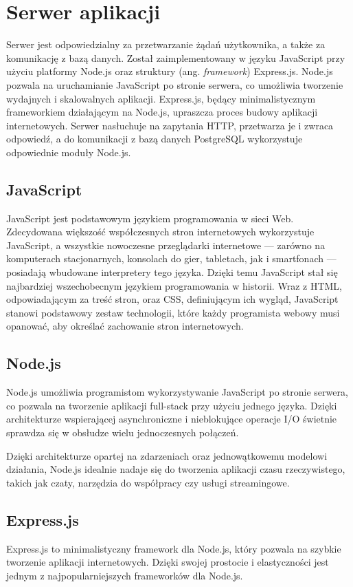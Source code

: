 \section{Serwer aplikacji}
Serwer jest odpowiedzialny za przetwarzanie żądań użytkownika, a także za komunikację z bazą danych. Został zaimplementowany w języku JavaScript przy użyciu platformy Node.js oraz struktury (ang. \textit{framework}) Express.js. Node.js pozwala na uruchamianie JavaScript po stronie serwera, co umożliwia tworzenie wydajnych i skalowalnych aplikacji. Express.js, będący minimalistycznym frameworkiem działającym na Node.js, upraszcza proces budowy aplikacji internetowych. Serwer nasłuchuje na zapytania HTTP, przetwarza je i zwraca odpowiedź, a do komunikacji z bazą danych PostgreSQL wykorzystuje odpowiednie moduły Node.js.


\subsection{JavaScript}
JavaScript jest podstawowym językiem programowania w sieci Web. Zdecydowana większość współczesnych stron internetowych wykorzystuje JavaScript, a wszystkie nowoczesne przeglądarki internetowe — zarówno na komputerach stacjonarnych, konsolach do gier, tabletach, jak i smartfonach — posiadają wbudowane interpretery tego języka. Dzięki temu JavaScript stał się najbardziej wszechobecnym językiem programowania w historii. Wraz z HTML, odpowiadającym za treść stron, oraz CSS, definiującym ich wygląd, JavaScript stanowi podstawowy zestaw technologii, które każdy programista webowy musi opanować, aby określać zachowanie stron internetowych. \cite{flanagan2011javascript}


\subsection{Node.js}
Node.js umożliwia programistom wykorzystywanie JavaScript po stronie serwera, co pozwala na tworzenie aplikacji full-stack przy użyciu jednego języka. Dzięki architekturze wspierającej asynchroniczne i nieblokujące operacje I/O świetnie sprawdza się w obsłudze wielu jednoczesnych połączeń. \cite{peters2017building}

Dzięki architekturze opartej na zdarzeniach oraz jednowątkowemu modelowi działania, Node.js idealnie nadaje się do tworzenia aplikacji czasu rzeczywistego, takich jak czaty, narzędzia do współpracy czy usługi streamingowe. \cite{peters2017building}

\subsection{Express.js}
Express.js to minimalistyczny framework dla Node.js, który pozwala na szybkie tworzenie aplikacji internetowych. Dzięki swojej prostocie i elastyczności jest jednym z najpopularniejszych frameworków dla Node.js.

